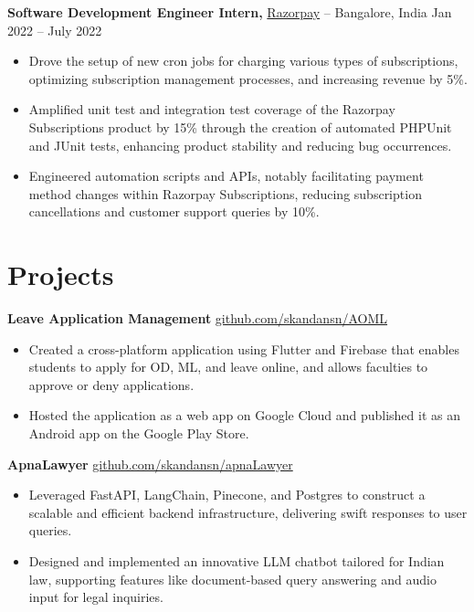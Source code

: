 \documentclass[11pt]{article}       %
\begin{document}
\textbf{Software Development Engineer Intern,} \href{https://razorpay.com/}{Razorpay} -- Bangalore, India \hfill Jan 2022 -- July 2022 \\
\vspace{-9pt}
\begin{itemize}
  \label{sdei}

\item Drove the setup of new cron jobs for charging various types of subscriptions, optimizing subscription management processes, and increasing revenue by 5\%.\item Amplified unit test and integration test coverage of the Razorpay Subscriptions product by 15\% through the creation of automated PHPUnit and JUnit tests, enhancing product stability and reducing bug occurrences.\item Engineered automation scripts and APIs, notably facilitating payment method changes within Razorpay Subscriptions, reducing subscription cancellations and customer support queries by 10\%.\end{itemize}


\vspace{-18.5pt}

\section*{Projects}
\textbf{Leave Application Management} \hfill \href{https://github.com/skandansn/AOML}{github.com/skandansn/AOML} \\
\vspace{-9pt}
\begin{itemize}
  \label{projects1}

\item Created a cross-platform application using Flutter and Firebase that enables students to apply for OD, ML, and leave online, and allows faculties to approve or deny applications.\item Hosted the application as a web app on Google Cloud and published it as an Android app on the Google Play Store.\end{itemize}

\textbf{ApnaLawyer} \hfill \href{https://github.com/skandansn/apnaLawyer}{github.com/skandansn/apnaLawyer} \\
\vspace{-9pt}
\begin{itemize}
  \label{projects2}

\item Leveraged FastAPI, LangChain, Pinecone, and Postgres to construct a scalable and efficient backend infrastructure, delivering swift responses to user queries.\item Designed and implemented an innovative LLM chatbot tailored for Indian law, supporting features like document-based query answering and audio input for legal inquiries.\end{itemize}
\end{document}
